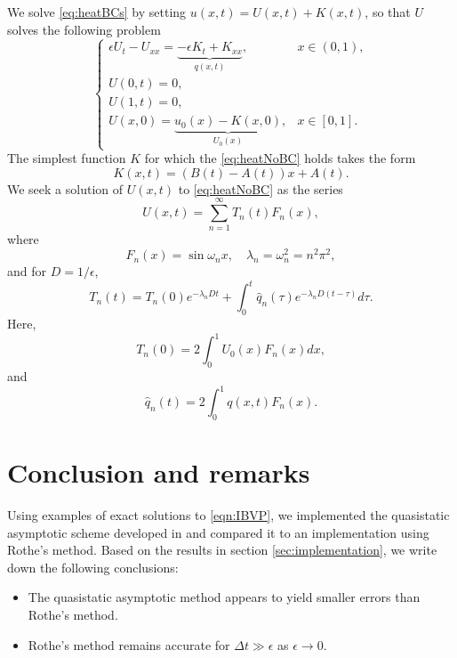 \documentclass[11pt]{article}
\numberwithin{equation}{section}
\newcommand{\dt}{\Delta t}
\newcommand{\beq}{\begin{equation}}
\newcommand{\eeq}{\end{equation}}
\begin{document}
We solve \eqref{eq:heatBCs} by setting $u(x,t) = U(x,t) + K(x,t)$, so that $U$ solves the following problem 
\beq\label{eq:heatNoBC}
\begin{cases}
\epsilon U_{t} - U_{xx} = \underbrace{-\epsilon K_t + K_{xx}}_{q(x,t)} , & x\in(0,1),\\
U(0,t) = 0,\\
U(1,t) = 0, \\
U(x, 0) = \underbrace{u_0(x) - K(x,0)}_{U_{0}(x)}, & x\in [0,1]. 
\end{cases}
\eeq
The simplest function $K$ for which the \eqref{eq:heatNoBC} holds takes the form 
\beq
K(x,t) = (B(t) - A(t)) x + A(t). 
\eeq
We seek a solution of $U(x,t)$ to \eqref{eq:heatNoBC} as the series 
\beq
U(x,t) = \sum_{n = 1}^{\infty} T_{n}(t)F_{n}(x), 
\eeq
where 
\beq
F_n(x) = \sin\omega_n x, \quad \lambda_n = \omega_n^2 = n^2\pi^2, 
\eeq
and for $D = 1/\epsilon$, 
\beq
T_n(t) = T_n(0)e^{-\lambda_n D t} + \int_{0}^t\hat{q}_n(\tau)e^{-\lambda_nD(t - \tau)}d\tau. 
\eeq
Here, 
\beq
T_n(0) = 2\int_{0}^1U_{0}(x)F_n(x)dx, 
\eeq
and 
\beq
\hat q_n(t) = 2\int_{0}^1q(x,t)F_n(x). 
\eeq
\section{Conclusion and remarks}
Using examples of exact solutions to \eqref{eqn:IBVP}, we implemented the quasistatic asymptotic scheme developed in \cite{quasistaticNotes} and compared it to an implementation using Rothe’s method. Based on the results in section \ref{sec:implementation}, we write down the following conclusions: 
\begin{itemize}
\item The quasistatic asymptotic method appears to yield smaller errors than Rothe's method. 
\item Rothe's method remains accurate for $\dt\gg \epsilon$ as $\epsilon \rightarrow 0$. 
\end{itemize}
	 \clearpage



  
\end{document}
